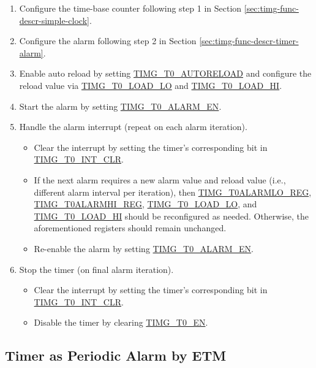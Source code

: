 \documentclass[main\_\_EN.tex]{subfiles}
\begin{document}
\begin{enumerate}
    \item Configure the time-base counter following step 1 in Section \ref{sec:timg-func-descr-simple-clock}.
    \item Configure the alarm following step 2 in Section \ref{sec:timg-func-descr-timer-alarm}.
    \item Enable auto reload by setting \hyperref[fielddesc:TIMGTXAUTORELOAD]{TIMG\_T0\_AUTORELOAD} and configure the reload value via \hyperref[fielddesc:TIMGTXLOADLO]{TIMG\_T0\_LOAD\_LO} and \hyperref[fielddesc:TIMGTXLOADHI]{TIMG\_T0\_LOAD\_HI}.
    \item Start the alarm by setting \hyperref[fielddesc:TIMGTXALARMEN]{TIMG\_T0\_ALARM\_EN}.
    \item Handle the alarm interrupt (repeat on each alarm iteration).
    \begin{itemize}
        \item Clear the interrupt by setting the timer's corresponding bit in \hyperref[fielddesc:TIMGT0INTCLR]{TIMG\_T0\_INT\_CLR}.
        \item If the next alarm requires a new alarm value and reload value (i.e., different alarm interval per iteration), then \hyperref[regdesc:TIMGTXALARMLOREG]{TIMG\_T0ALARMLO\_REG}, \hyperref[regdesc:TIMGTXALARMHIREG]{TIMG\_T0ALARMHI\_REG}, \hyperref[fielddesc:TIMGTXLOADLO]{TIMG\_T0\_LOAD\_LO}, and \hyperref[fielddesc:TIMGTXLOADHI]{TIMG\_T0\_LOAD\_HI} should be reconfigured as needed. Otherwise, the aforementioned registers should remain unchanged.
        \item Re-enable the alarm by setting \hyperref[fielddesc:TIMGTXALARMEN]{TIMG\_T0\_ALARM\_EN}.
    \end{itemize}
    \item Stop the timer (on final alarm iteration).
    \begin{itemize}
        \item Clear the interrupt by setting the timer's corresponding bit in \hyperref[fielddesc:TIMGT0INTCLR]{TIMG\_T0\_INT\_CLR}.
        \item Disable the timer by clearing \hyperref[fielddesc:TIMGTXEN]{TIMG\_T0\_EN}.
    \end{itemize}
\end{enumerate}

\subsection{Timer as Periodic Alarm by ETM}
\label{sec:timg-conf-etm}
\end{document}
